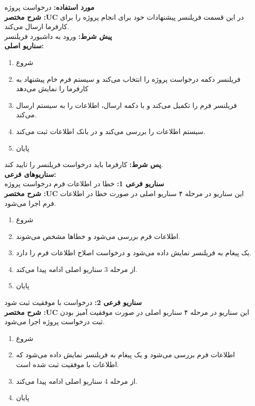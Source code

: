 \textbf{مورد استفاده:}
درخواست پروژه
\\
\textbf{شرح مختصر :UC}
در این قسمت فریلنسر پیشنهادات خود برای انجام پروژه را برای کارفرما ارسال می‌کند.
\\
\textbf{پيش شرط:}
ورود به داشبورد فریلنسر
\\
\textbf{سناريو اصلی:}
\begin{enumerate}
\item
شروع
\item
فریلنسر دکمه درخواست پروژه را انتخاب می‌کند و سیستم فرم خام پیشنهاد به کارفرما را نمایش می‌دهد
\item
فریلنسر فرم را تکمیل می‌کند و با دکمه ارسال، اطلاعات را به سیستم ارسال می‌کند.
\item
سیستم اطلاعات را بررسی می‌کند و در بانک اطلاعات ثبت می‌کند.
\item
پایان
\end{enumerate}

\noindent
\textbf{پس شرط:}
کارفرما باید درخواست فریلنسر را تایید کند.
\\
\textbf{سناريوهای فرعی:}
\\
\textbf{سناريو فرعی 1:}
خطا در اطلاعات فرم درخواست پروژه
\\
\textbf{شرح مختصر :UC}
این سناریو در مرحله ۴ سناریو اصلی در صورت خطا در اطلاعات فرم اجرا می‌شود.
\begin{enumerate}
\item
شروع
\item
اطلاعات فرم بررسی می‌شود و خطاها مشخص می‌شوند.
\item
یک پیغام به فریلنسر نمایش داده می‌شود و درخواست اصلاح اطلاعات فرم را دارد.
\item
از مرحله 3 سناریو اصلی ادامه پیدا می‌کند.
\item
پایان
\end{enumerate}

\noindent
\textbf{سناريو فرعی 2:}
درخواست با موفقیت ثبت شود
\\
\textbf{شرح مختصر :UC}
این سناریو در مرحله ۴ سناریو اصلی در صورت موفقیت آمیز بودن ثبت درخواست پروژه اجرا می‌شود.
\begin{enumerate}
\item
شروع
\item
اطلاعات فرم بررسی می‌شود و یک پیغام به فریلنسر نمایش داده می‌شود که اطلاعات با موفقیت ثبت شده است.
\item
از مرحله 4 سناریو اصلی ادامه پیدا می‌کند.
\item
پایان
\end{enumerate}

